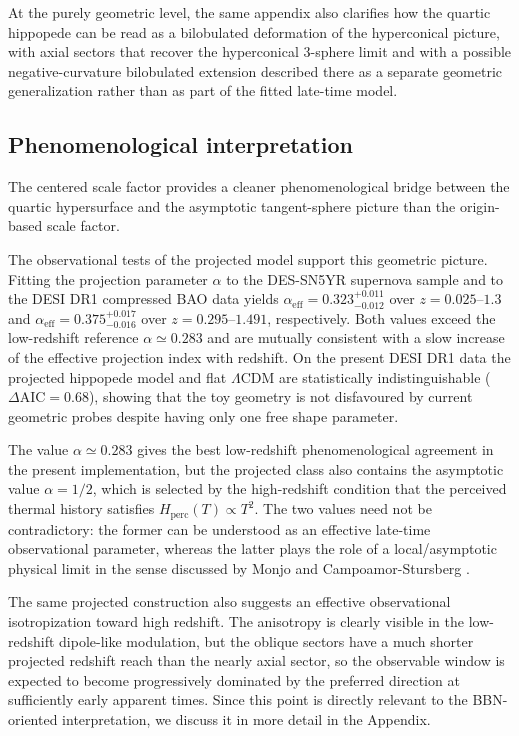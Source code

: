 \documentclass[3p,times,twocolumn]{elsarticle}
\begin{document}
At the purely geometric level, the same appendix also clarifies how the quartic hippopede can be read as a bilobulated deformation of the hyperconical picture, with axial sectors that recover the hyperconical $3$-sphere limit and with a possible negative-curvature bilobulated extension described there as a separate geometric generalization rather than as part of the fitted late-time model.

\subsection{Phenomenological interpretation}

The centered scale factor provides a cleaner phenomenological bridge between the quartic hypersurface and the asymptotic tangent-sphere picture than the origin-based scale factor.

The observational tests of the projected model support this geometric picture. Fitting the projection parameter $\alpha$ to the DES-SN5YR supernova sample and to the DESI DR1 compressed BAO data yields $\alpha_{\mathrm{eff}}=0.323_{-0.012}^{+0.011}$ over $z=0.025$--$1.3$ and $\alpha_{\mathrm{eff}}=0.375_{-0.016}^{+0.017}$ over $z=0.295$--$1.491$, respectively. Both values exceed the low-redshift reference $\alpha\simeq0.283$ and are mutually consistent with a slow increase of the effective projection index with redshift. On the present DESI DR1 data the projected hippopede model and flat $\Lambda$CDM are statistically indistinguishable ($\Delta\mathrm{AIC}=0.68$), showing that the toy geometry is not disfavoured by current geometric probes despite having only one free shape parameter.

The value $\alpha\simeq0.283$ gives the best low-redshift phenomenological agreement in the present implementation, but the projected class also contains the asymptotic value $\alpha=1/2$, which is selected by the high-redshift condition that the perceived thermal history satisfies $H_{\mathrm{perc}}(T)\propto T^2$. The two values need not be contradictory: the former can be understood as an effective late-time observational parameter, whereas the latter plays the role of a local/asymptotic physical limit in the sense discussed by Monjo and Campoamor-Stursberg \cite{monjo2020lagrangian, monjo2023hubble}.

The same projected construction also suggests an effective observational isotropization toward high redshift. The anisotropy is clearly visible in the low-redshift dipole-like modulation, but the oblique sectors have a much shorter projected redshift reach than the nearly axial sector, so the observable window is expected to become progressively dominated by the preferred direction at sufficiently early apparent times. Since this point is directly relevant to the BBN-oriented interpretation, we discuss it in more detail in the Appendix.
\end{document}

